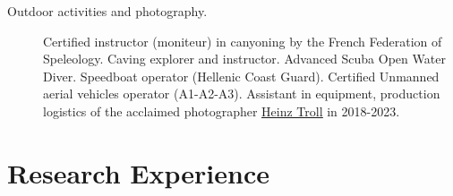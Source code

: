 \begin{description}
    \item[Outdoor activities and photography.] Certified instructor (moniteur) in canyoning by the French Federation of Speleology. 
        Caving explorer and instructor. 
        Advanced Scuba Open Water Diver.
        Speedboat operator (Hellenic Coast Guard).
        Certified Unmanned aerial vehicles operator (A1-A2-A3).
        Assistant in equipment, production logistics of the acclaimed photographer 
      \underline{\href{https://heinztrollphotography.com}{Heinz Troll}} in 2018-2023.
  
\end{description}

\section{Research Experience}

